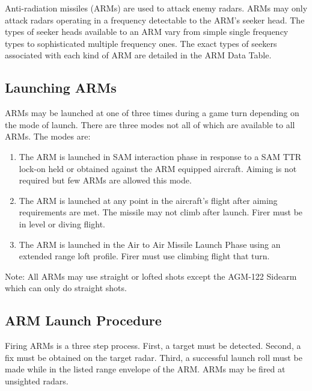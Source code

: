 
\label{rule:arms}

Anti-radiation missiles (ARMs) are used to attack enemy radars. ARMs may only attack radars operating in a frequency detectable to the ARM's seeker head. The types of seeker heads available to an ARM vary from simple single frequency types to sophisticated multiple frequency ones. The exact types of seekers associated with each kind of ARM are detailed in the ARM Data Table.

\subsection{Launching ARMs} ARMs may be launched at one of three times during a game turn depending on the mode of launch. There are three modes not all of which are available to all ARMs. The modes are:

\begin{enumerate}

\item[1)] The ARM is launched in SAM interaction phase in response to a SAM TTR lock-on held or obtained against the ARM equipped aircraft. Aiming is not required but few ARMs are allowed this mode.

\item[2)] The ARM is launched at any point in the aircraft's flight after aiming requirements are met. The missile may not climb after launch. Firer must be in level or diving flight.

\item[3)] The ARM is launched in the Air to Air Missile Launch Phase using an extended range loft profile. Firer must use climbing flight that turn.

\end{enumerate}


Note: All ARMs may use straight or lofted shots except the AGM-122 Sidearm which can only do straight shots.

\subsection{ARM Launch Procedure} Firing ARMs is a three step process. First, a target must be detected. Second, a fix must be obtained on the target radar. Third, a successful launch roll must be made while in the listed range envelope of the ARM. ARMs may be fired at unsighted radars.

